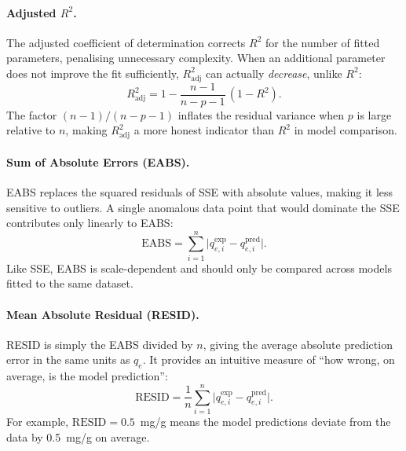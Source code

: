 \documentclass[12pt]{article}
\begin{document}
	\paragraph{Adjusted $R^{2}$.}
	The adjusted coefficient of determination corrects $R^{2}$ for
	the number of fitted parameters, penalising unnecessary complexity.
	When an additional parameter does not improve the fit sufficiently,
	$R^{2}_{\mathrm{adj}}$ can actually \emph{decrease}, unlike
	$R^{2}$:
	\begin{equation}
		R_{\mathrm{adj}}^{2}
		= 1 - \frac{n - 1}{n - p - 1}\,(1 - R^{2}).
		\label{eq:R2adj}
	\end{equation}
	The factor $(n-1)/(n-p-1)$ inflates the residual variance when
	$p$ is large relative to $n$, making $R^{2}_{\mathrm{adj}}$ a
	more honest indicator than $R^{2}$ in model comparison.

	\paragraph{Sum of Absolute Errors (EABS).}
	EABS replaces the squared residuals of SSE with absolute values,
	making it less sensitive to outliers. A single anomalous data
	point that would dominate the SSE contributes only linearly to
	EABS:
	\begin{equation}
		\mathrm{EABS}
		= \sum_{i=1}^{n}
		\bigl|q_{e,i}^{\exp} - q_{e,i}^{\mathrm{pred}}\bigr|.
		\label{eq:EABS}
	\end{equation}
	Like SSE, EABS is scale-dependent and should only be compared
	across models fitted to the same dataset.

	\paragraph{Mean Absolute Residual (RESID).}
	RESID is simply the EABS divided by $n$, giving the average
	absolute prediction error in the same units as $q_e$. It
	provides an intuitive measure of ``how wrong, on average, is
	the model prediction'':
	\begin{equation}
		\mathrm{RESID}
		= \frac{1}{n}\sum_{i=1}^{n}
		\bigl|q_{e,i}^{\exp} - q_{e,i}^{\mathrm{pred}}\bigr|.
		\label{eq:RESID}
	\end{equation}
	For example, $\mathrm{RESID} = 0.5$~mg/g means the model
	predictions deviate from the data by 0.5~mg/g on average.
\end{document}
